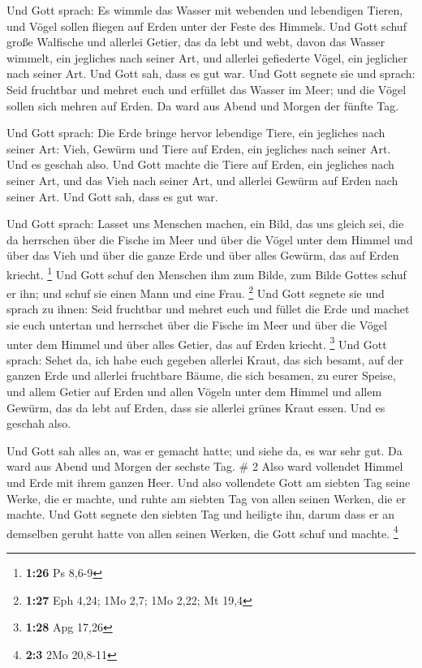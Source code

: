  Und Gott sprach: Es wimmle das Wasser mit webenden und
lebendigen Tieren, und Vögel sollen fliegen auf Erden unter der Feste
des Himmels.  Und Gott schuf große Walfische und allerlei
Getier, das da lebt und webt, davon das Wasser wimmelt, ein jegliches
nach seiner Art, und allerlei gefiederte Vögel, ein jeglicher nach
seiner Art. Und Gott sah, dass es gut war.  Und Gott
segnete sie und sprach: Seid fruchtbar und mehret euch und erfüllet das
Wasser im Meer; und die Vögel sollen sich mehren auf Erden.
 Da ward aus Abend und Morgen der fünfte Tag.

 Und Gott sprach: Die Erde bringe hervor lebendige Tiere,
ein jegliches nach seiner Art: Vieh, Gewürm und Tiere auf Erden, ein
jegliches nach seiner Art. Und es geschah also.  Und Gott
machte die Tiere auf Erden, ein jegliches nach seiner Art, und das Vieh
nach seiner Art, und allerlei Gewürm auf Erden nach seiner Art. Und Gott
sah, dass es gut war.

 Und Gott sprach: Lasset uns Menschen machen, ein Bild,
das uns gleich sei, die da herrschen über die Fische im Meer und über
die Vögel unter dem Himmel und über das Vieh und über die ganze Erde und
über alles Gewürm, das auf Erden kriecht. \footnote{\textbf{1:26} Ps
  8,6-9}  Und Gott schuf den Menschen ihm zum Bilde, zum
Bilde Gottes schuf er ihn; und schuf sie einen Mann und eine Frau.
\footnote{\textbf{1:27} Eph 4,24; 1Mo 2,7; 1Mo 2,22; Mt 19,4}
 Und Gott segnete sie und sprach zu ihnen: Seid fruchtbar
und mehret euch und füllet die Erde und machet sie euch untertan und
herrschet über die Fische im Meer und über die Vögel unter dem Himmel
und über alles Getier, das auf Erden kriecht. \footnote{\textbf{1:28}
  Apg 17,26}  Und Gott sprach: Sehet da, ich habe euch
gegeben allerlei Kraut, das sich besamt, auf der ganzen Erde und
allerlei fruchtbare Bäume, die sich besamen, zu eurer Speise,
 und allem Getier auf Erden und allen Vögeln unter dem
Himmel und allem Gewürm, das da lebt auf Erden, dass sie allerlei grünes
Kraut essen. Und es geschah also.

 Und Gott sah alles an, was er gemacht hatte; und siehe
da, es war sehr gut. Da ward aus Abend und Morgen der sechste Tag. \# 2
 Also ward vollendet Himmel und Erde mit ihrem ganzen
Heer.  Und also vollendete Gott am siebten Tag seine
Werke, die er machte, und ruhte am siebten Tag von allen seinen Werken,
die er machte.  Und Gott segnete den siebten Tag und
heiligte ihn, darum dass er an demselben geruht hatte von allen seinen
Werken, die Gott schuf und machte. \footnote{\textbf{2:3} 2Mo 20,8-11}

